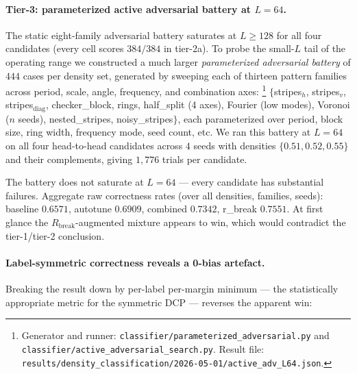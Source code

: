 \documentclass[11pt,a4paper]{article}
\newcommand{\fpath}[1]{\nolinkurl{#1}}
\begin{document}
\paragraph{Tier-3: parameterized active adversarial battery at \(L=64\).}
The static eight-family adversarial battery saturates at \(L \geq
128\) for all four candidates (every cell scores \(384/384\) in
tier-2a).  To probe the small-\(L\) tail of the operating range we
constructed a much larger \emph{parameterized adversarial battery}
of \(444\) cases per density set, generated by sweeping each of
thirteen pattern families across period, scale, angle, frequency,
and combination axes:%
\footnote{Generator and runner:
\fpath{classifier/parameterized_adversarial.py} and
\fpath{classifier/active_adversarial_search.py}.  Result file:
\fpath{results/density_classification/2026-05-01/active_adv_L64.json}.}
\(\{\)stripes\(_h\), stripes\(_v\), stripes\(_{\mathrm{diag}}\),
checker\_block, rings, half\_split (4 axes), Fourier (low
modes), Voronoi (\(n\) seeds), nested\_stripes,
noisy\_stripes\(\}\), each parameterized over period, block size,
ring width, frequency mode, seed count, etc.  We ran this battery
at \(L=64\) on all four head-to-head candidates across \(4\) seeds
with densities \(\{0.51, 0.52, 0.55\}\) and their complements,
giving \(1{,}776\) trials per candidate.

The battery does not saturate at \(L=64\) --- every candidate has
substantial failures.  Aggregate raw correctness rates (over all
densities, families, seeds): baseline \(0.6571\), autotune
\(0.6909\), combined \(0.7342\), r\_break \(0.7551\).  At first
glance the \(R_{\mathrm{break}}\)-augmented mixture appears to win,
which would contradict the tier-1/tier-2 conclusion.

\paragraph{Label-symmetric correctness reveals a 0-bias artefact.}
Breaking the result down by per-label per-margin minimum --- the
statistically appropriate metric for the symmetric DCP --- reverses
the apparent win:
\end{document}
